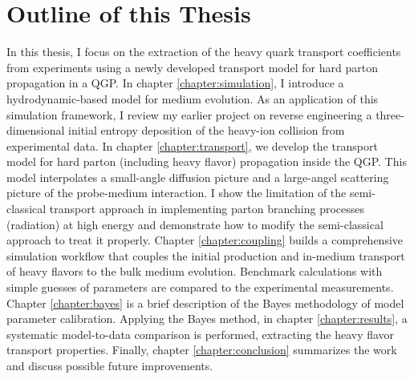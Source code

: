 \section{Outline of this Thesis}
In this thesis, I focus on the extraction of the heavy quark transport coefficients from experiments using a newly developed transport model for hard parton propagation in a QGP.
In chapter \ref{chapter:simulation}, I introduce a hydrodynamic-based model for medium evolution. 
As an application of this simulation framework, I review my earlier project on reverse engineering a three-dimensional initial entropy deposition of the heavy-ion collision from experimental data. 
In chapter \ref{chapter:transport}, we develop the transport model for hard parton (including heavy flavor) propagation inside the QGP.
This model interpolates a small-angle diffusion picture and a large-angel scattering picture of the probe-medium interaction.
I show the limitation of the semi-classical transport approach in implementing parton branching processes (radiation) at high energy and demonstrate how to modify the semi-classical approach to treat it properly.
Chapter \ref{chapter:coupling} builds a comprehensive simulation workflow that couples the initial production and in-medium transport of heavy flavors to the bulk medium evolution.
Benchmark calculations with simple guesses of parameters are compared to the experimental measurements.
Chapter \ref{chapter:bayes} is a brief description of the Bayes methodology of model parameter calibration.
Applying the Bayes method, in chapter \ref{chapter:results}, a systematic model-to-data comparison is performed, extracting the heavy flavor transport properties.
Finally, chapter \ref{chapter:conclusion} summarizes the work and discuss possible future improvements.


